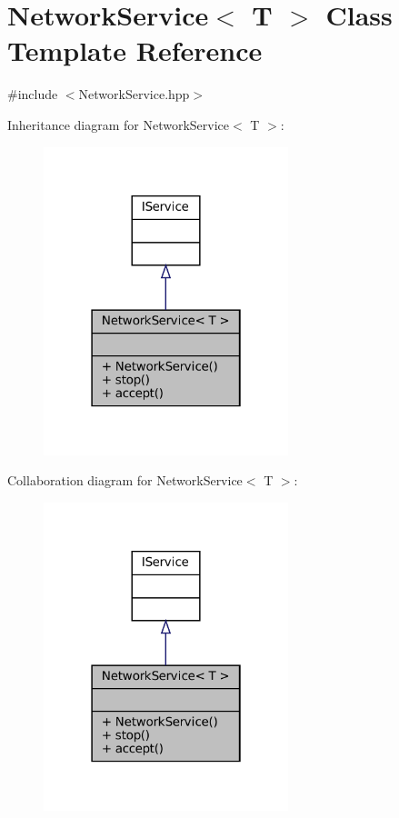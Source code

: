 \hypertarget{classNetworkService}{}\section{Network\+Service$<$ T $>$ Class Template Reference}
\label{classNetworkService}


{\ttfamily \#include $<$Network\+Service.\+hpp$>$}



Inheritance diagram for Network\+Service$<$ T $>$\+:
\nopagebreak
\begin{figure}[H]
\begin{center}
\leavevmode
\includegraphics[width=202pt]{classNetworkService__inherit__graph}
\end{center}
\end{figure}


Collaboration diagram for Network\+Service$<$ T $>$\+:
\nopagebreak
\begin{figure}[H]
\begin{center}
\leavevmode
\includegraphics[width=202pt]{classNetworkService__coll__graph}
\end{center}
\end{figure}
